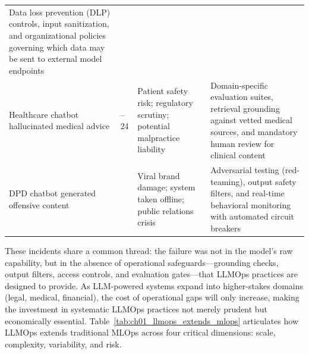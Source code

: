 \begin{table}[t]
\begin{tabularx}{\linewidth}{@{}>{\raggedright\arraybackslash}p{26mm}>{\raggedright\arraybackslash}p{14mm}>{\raggedright\arraybackslash}X>{\raggedright\arraybackslash}X@{}}
Data loss prevention\index{data loss prevention} (DLP) controls, input sanitization, and organizational policies governing which data may be sent to external model endpoints \\
\addlinespace[2pt]
Healthcare chatbot hallucinated medical advice\index{hallucination!healthcare} &
2023--24 &
Patient safety risk; regulatory scrutiny; potential malpractice liability &
Domain-specific evaluation suites\index{evaluation!domain-specific}, retrieval grounding against vetted medical sources, and mandatory human review for clinical content \\
\addlinespace[2pt]
DPD chatbot generated offensive content\index{DPD chatbot} &
2024 &
Viral brand damage; system taken offline; public relations crisis &
Adversarial testing\index{adversarial testing} (red-teaming), output safety filters, and real-time behavioral monitoring\index{monitoring!behavioral} with automated circuit breakers \\
\bottomrule
\end{tabularx}
\end{table}

These incidents share a common thread: the failure was not in the model's raw capability, but in the absence of operational safeguards---grounding checks, output filters, access controls, and evaluation gates---that LLMOps practices are designed to provide. As LLM-powered systems expand into higher-stakes domains (legal, medical, financial), the cost of operational gaps will only increase, making the investment in systematic LLMOps practices not merely prudent but economically essential. Table~\ref{tab:ch01_llmops_extends_mlops} articulates how LLMOps extends traditional MLOps across four critical dimensions: scale, complexity, variability, and risk.

